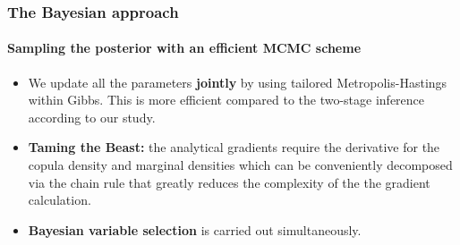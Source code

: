 \documentclass[10pt,aspectratio=43]{beamer}
\begin{document}
\begin{frame}%
  \frametitle{The Bayesian approach}
  \framesubtitle{Sampling the posterior with an efficient MCMC scheme}
  \begin{itemize}
  \item We update all the parameters \textbf{jointly} by using tailored
    Metropolis-Hastings within Gibbs. This is more efficient compared to the two-stage
    inference according to our study.

  \item \textbf{Taming the Beast:} the analytical gradients require the derivative for the
    copula density and marginal densities which can be conveniently decomposed via the
    chain rule that greatly reduces the complexity of the the gradient calculation.


  \item \textbf{Bayesian variable selection} is carried out simultaneously.





\end{itemize}
\end{frame}
\end{document}
